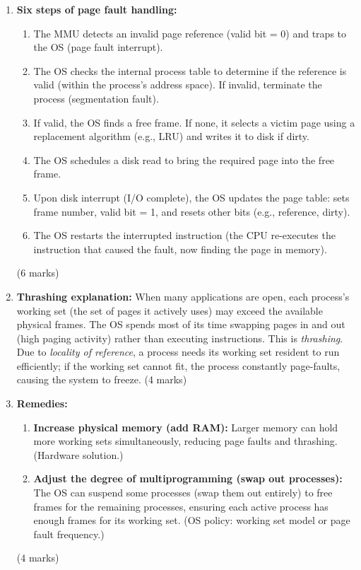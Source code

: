 \documentclass[11pt]{article}
\begin{document}
\begin{corrige}
\begin{enumerate}
\item \textbf{Six steps of page fault handling:}
\begin{enumerate}
\item The MMU detects an invalid page reference (valid bit = 0) and traps to the OS (page fault interrupt).
\item The OS checks the internal process table to determine if the reference is valid (within the process's address space). If invalid, terminate the process (segmentation fault).
\item If valid, the OS finds a free frame. If none, it selects a victim page using a replacement algorithm (e.g., LRU) and writes it to disk if dirty.
\item The OS schedules a disk read to bring the required page into the free frame.
\item Upon disk interrupt (I/O complete), the OS updates the page table: sets frame number, valid bit = 1, and resets other bits (e.g., reference, dirty).
\item The OS restarts the interrupted instruction (the CPU re-executes the instruction that caused the fault, now finding the page in memory).
\end{enumerate}
\hfill (6 marks)

\item \textbf{Thrashing explanation:} When many applications are open, each process's working set (the set of pages it actively uses) may exceed the available physical frames. The OS spends most of its time swapping pages in and out (high paging activity) rather than executing instructions. This is \emph{thrashing}. Due to \emph{locality of reference}, a process needs its working set resident to run efficiently; if the working set cannot fit, the process constantly page-faults, causing the system to freeze. \hfill (4 marks)

\item \textbf{Remedies:}
\begin{enumerate}
\item \textbf{Increase physical memory (add RAM):} Larger memory can hold more working sets simultaneously, reducing page faults and thrashing. (Hardware solution.)
\item \textbf{Adjust the degree of multiprogramming (swap out processes):} The OS can suspend some processes (swap them out entirely) to free frames for the remaining processes, ensuring each active process has enough frames for its working set. (OS policy: working set model or page fault frequency.)
\end{enumerate}
\hfill (4 marks)
\end{enumerate}
\end{corrige}
\end{document}
